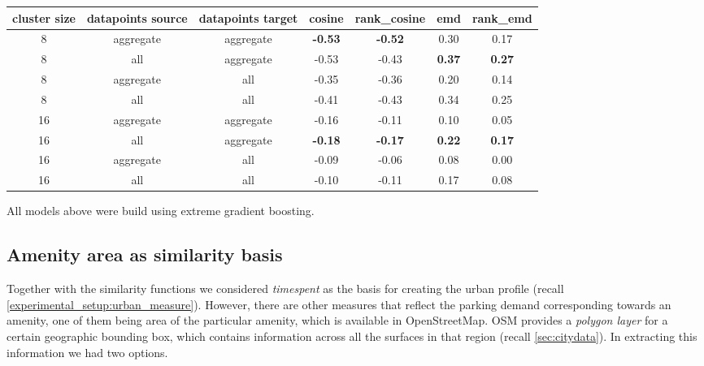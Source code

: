 \begin{table}[!ht]
	{\begin{tabular}{ | c | c | c | c | c | c | c | }
		\hline
		{cluster size} & {datapoints source} & {datapoints target} & cosine & rank\_cosine & emd & rank\_emd \\ \hline
		8	&	aggregate 	&	aggregate 	& 	\textbf{-0.53}	&	\textbf{-0.52}	&	0.30	&	0.17 	\\ \hline
		8	&	all 		&	aggregate 	& 	-0.53	&	-0.43	&	\textbf{0.37}	&	\textbf{0.27}	\\ \hline \hline
		8	&	aggregate 	&	all 		& 	-0.35	&	-0.36	&	0.20	&	0.14	\\ \hline
		8	&	all			& 	all 		&	-0.41	&	-0.43	&	0.34	&	0.25	\\ \hline \hline
		16	&	aggregate	& 	aggregate 	&	-0.16	&	-0.11	&	0.10	&	0.05	\\ \hline
		16	&	all			& 	aggregate 	& 	\textbf{-0.18}	&	\textbf{-0.17}	&	\textbf{0.22}	&	\textbf{0.17}	\\ \hline \hline
		16	&	aggregate	& 	all 		& 	-0.09	&	-0.06	&	0.08	&	0.00	\\ \hline
		16	&	all			&	all 		&	-0.10	&	-0.11	&	0.17	&	0.08	\\ \hline \hline
	\end{tabular}}
	\label{tab:correlation_values}
	\begin{tabnote}
		All models above were build using extreme gradient boosting.
	\end{tabnote}
\end{table}
	
	
\subsection{Amenity area as similarity basis}
\label{extensions:amenity_area}
Together with the similarity functions we considered \textit{timespent} as the basis for creating the urban profile (recall \ref{experimental_setup:urban_measure}). However, there are other measures that reflect the parking demand corresponding towards an amenity, one of them being area of the particular amenity, which is available in OpenStreetMap. OSM provides a \textit{polygon layer} for a certain geographic bounding box, which contains information across all the surfaces in that region (recall \ref{sec:citydata}). In extracting this information we had two options. 

